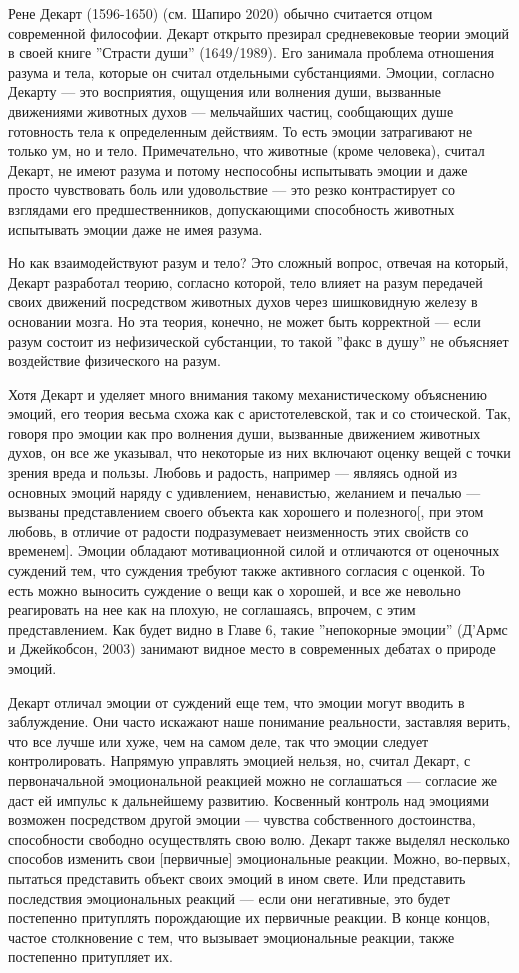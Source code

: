 \documentclass[11pt]{book}
\begin{document}
Рене Декарт (1596-1650) (см. Шапиро 2020) обычно считается отцом современной философии. Декарт открыто презирал средневековые теории эмоций в своей книге ''Страсти души'' (1649/1989). Его занимала проблема отношения разума и тела, которые он считал отдельными субстанциями. Эмоции, согласно Декарту --- это восприятия, ощущения или волнения души, вызванные движениями животных духов --- мельчайших частиц, сообщающих душе готовность тела к определенным действиям. То есть эмоции затрагивают не только ум, но и тело. Примечательно, что животные (кроме человека), считал Декарт, не имеют разума и потому неспособны испытывать эмоции и даже просто чувствовать боль или удовольствие --- это резко контрастирует со взглядами его предшественников, допускающими способность животных испытывать эмоции даже не имея разума.

Но как взаимодействуют разум и тело? Это сложный вопрос, отвечая на который, Декарт разработал теорию, согласно которой, тело влияет на разум передачей своих движений посредством животных духов через шишковидную железу в основании мозга. Но эта теория, конечно, не может быть корректной --- если разум состоит из нефизической субстанции, то такой ''факс в душу'' не объясняет воздействие физического на разум.

Хотя Декарт и уделяет много внимания такому механистическому объяснению эмоций, его теория весьма схожа как с аристотелевской, так и со стоической. Так, говоря про эмоции как про волнения души, вызванные движением животных духов, он все же указывал, что некоторые из них включают оценку вещей с точки зрения вреда и пользы. Любовь и радость, например --- являясь одной из основных эмоций наряду с удивлением, ненавистью, желанием и печалью --- вызваны представлением своего объекта как хорошего и полезного[, при этом любовь, в отличие от радости подразумевает неизменность этих свойств со временем]. Эмоции обладают мотивационной силой и отличаются от оценочных суждений тем, что суждения требуют также активного согласия с оценкой. То есть можно выносить суждение о вещи как о хорошей, и все же невольно реагировать на нее как на плохую, не соглашаясь, впрочем, с этим представлением. Как будет видно в Главе 6, такие ''непокорные эмоции'' (Д'Армс и Джейкобсон, 2003) занимают видное место в современных дебатах о природе эмоций.

Декарт отличал эмоции от суждений еще тем, что эмоции могут вводить в заблуждение. Они часто искажают наше понимание реальности, заставляя верить, что все лучше или хуже, чем на самом деле, так что эмоции следует контролировать. Напрямую управлять эмоцией нельзя, но, считал Декарт, с первоначальной эмоциональной реакцией можно не соглашаться --- согласие же даст ей импульс к дальнейшему развитию. Косвенный контроль над эмоциями возможен посредством другой эмоции --- чувства собственного достоинства, способности свободно осуществлять свою волю. Декарт также выделял несколько способов изменить свои [первичные] эмоциональные реакции. Можно, во-первых, пытаться представить объект своих эмоций в ином свете. Или представить последствия эмоциональных реакций --- если они негативные, это будет постепенно притуплять порождающие их первичные реакции. В конце концов, частое столкновение с тем, что вызывает эмоциональные реакции, также постепенно притупляет их.
\end{document}
